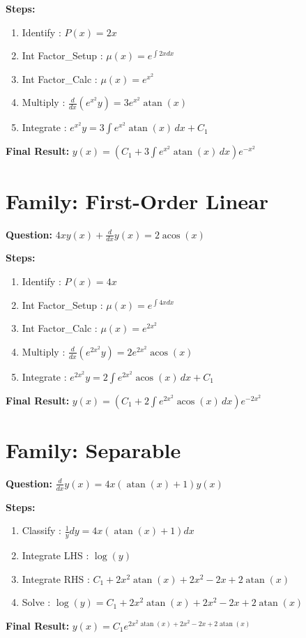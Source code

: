 \documentclass{article}
\begin{document}
\textbf{Steps:}
\begin{enumerate}
\item Identify :  $P(x) = 2 x$
\item Int Factor_Setup :  $\mu(x) = e^{\int 2 x dx}$
\item Int Factor_Calc :  $\mu(x) = e^{x^{2}}$
\item Multiply :  $\frac{d}{dx}(e^{x^{2}}y) = 3 e^{x^{2}} \operatorname{atan}{\left(x \right)}$
\item Integrate :  $e^{x^{2}}y = 3 \int e^{x^{2}} \operatorname{atan}{\left(x \right)}\, dx + C_1$
\end{enumerate}
\textbf{Final Result:} $y{\left(x \right)} = \left(C_{1} + 3 \int e^{x^{2}} \operatorname{atan}{\left(x \right)}\, dx\right) e^{- x^{2}}$

\section*{Family: First-Order Linear}
\textbf{Question:} $4 x y{\left(x \right)} + \frac{d}{d x} y{\left(x \right)} = 2 \operatorname{acos}{\left(x \right)}$

\textbf{Steps:}
\begin{enumerate}
\item Identify :  $P(x) = 4 x$
\item Int Factor_Setup :  $\mu(x) = e^{\int 4 x dx}$
\item Int Factor_Calc :  $\mu(x) = e^{2 x^{2}}$
\item Multiply :  $\frac{d}{dx}(e^{2 x^{2}}y) = 2 e^{2 x^{2}} \operatorname{acos}{\left(x \right)}$
\item Integrate :  $e^{2 x^{2}}y = 2 \int e^{2 x^{2}} \operatorname{acos}{\left(x \right)}\, dx + C_1$
\end{enumerate}
\textbf{Final Result:} $y{\left(x \right)} = \left(C_{1} + 2 \int e^{2 x^{2}} \operatorname{acos}{\left(x \right)}\, dx\right) e^{- 2 x^{2}}$

\section*{Family: Separable}
\textbf{Question:} $\frac{d}{d x} y{\left(x \right)} = 4 x \left(\operatorname{atan}{\left(x \right)} + 1\right) y{\left(x \right)}$

\textbf{Steps:}
\begin{enumerate}
\item Classify :  $\frac{1}{y} dy = 4 x \left(\operatorname{atan}{\left(x \right)} + 1\right) dx$
\item Integrate LHS :  $\log{\left(y \right)}$
\item Integrate RHS :  $C_{1} + 2 x^{2} \operatorname{atan}{\left(x \right)} + 2 x^{2} - 2 x + 2 \operatorname{atan}{\left(x \right)}$
\item Solve :  $\log{\left(y \right)} = C_{1} + 2 x^{2} \operatorname{atan}{\left(x \right)} + 2 x^{2} - 2 x + 2 \operatorname{atan}{\left(x \right)}$
\end{enumerate}
\textbf{Final Result:} $y{\left(x \right)} = C_{1} e^{2 x^{2} \operatorname{atan}{\left(x \right)} + 2 x^{2} - 2 x + 2 \operatorname{atan}{\left(x \right)}}$
\end{document}
